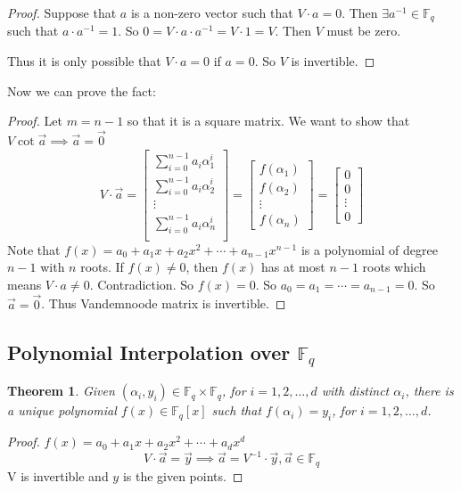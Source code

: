 \documentclass[letterpaper,12pt]{article}
\newtheorem{theorem}{Theorem}
\begin{document}
\begin{proof}
    Suppose that $a$ is a non-zero vector such that $V\cdot a=0$. Then $\exists a^{-1}\in \mathbb{F}_q$ such that $a\cdot a^{-1}=1$. So $0=V\cdot a\cdot a^{-1}=V\cdot 1=V$. Then $V$ must be zero.

    Thus it is only possible that $V\cdot a=0$ if $a=0$. So $V$ is invertible.
\end{proof}
Now we can prove the fact:
\begin{proof}
    Let $m=n-1$ so that it is a square matrix. We want to show that $V\cot \vec{a}\implies \vec{a}=\vec{0}$
    \[
        V\cdot \vec{a} = \begin{bmatrix}
            \sum_{i=0}^{n-1} a_i\alpha_1^i   \\
            \sum_{i=0}^{n-1} a_i\alpha_2^i   \\
            \vdots                           \\
            \sum_{i=0}^{n-1} a_i\alpha_{n}^i \\
        \end{bmatrix} =\begin{bmatrix}
            f(\alpha_1) \\
            f(\alpha_2) \\
            \vdots      \\
            f(\alpha_n)
        \end{bmatrix} = \begin{bmatrix}
            0      \\
            0      \\
            \vdots \\
            0
        \end{bmatrix}
    \]
    Note that $f(x)=a_0+a_1x+a_2x^2+\cdots+a_{n-1}x^{n-1}$ is a polynomial of
    degree $n-1$ with $n$ roots. If $f(x)\neq 0$, then $f(x)$ has at most $n-1$
    roots which means $V\cdot a\neq 0$. Contradiction. So $f(x)=0$. So
    $a_0=a_1=\cdots=a_{n-1}=0$. So $\vec{a}=\vec{0}$. Thus Vandemnoode matrix is
    invertible.

\end{proof}
\subsection{Polynomial Interpolation over ${\mathbb{F}_q}$}
\begin{theorem}
    Given $(\alpha_i,y_i)\in \mathbb{F}_q \times \mathbb{F}_q$, for $i=1,2,\ldots,d$ with distinct $\alpha_i$, there is a unique polynomial $f(x)\in \mathbb{F}_q[x]$ such that $f(\alpha_i)=y_i$, for $i=1,2,\ldots,d$.
\end{theorem} \begin{proof}
    $f(x)= a_0+a_1 x +a_2 x^2+\cdots + a_d x^d$
    \[
        V\cdot \vec{a}=\vec{y}\implies \vec{a}=V^{-1}\cdot \vec{y}, \vec{a}\in \mathbb{F}_q
    \]
    V is invertible and $y$ is the given points.
\end{proof}
\end{document}
